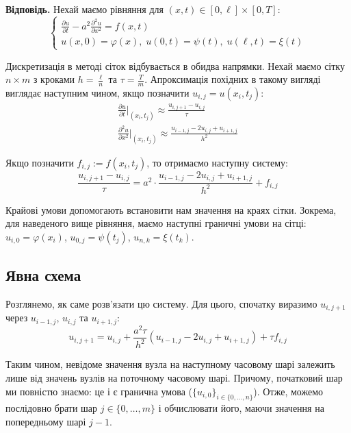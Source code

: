 \documentclass{test_template}
\begin{document}
\textbf{Відповідь.} Нехай маємо рівняння для $(x,t) \in [0,\ell] \times [0,T]$:
\begin{equation*}
    \begin{cases}
        \frac{\partial u}{\partial t} - a^2 \frac{\partial^2 u}{\partial x^2} = f(x,t) \\
        u(x,0) = \varphi(x), \; u(0,t) = \psi(t), \; u(\ell,t) = \xi(t)
    \end{cases}
\end{equation*}

Дискретизація в методі сіток відбувається в обидва напрямки. Нехай маємо сітку
$n \times m$ з кроками $h=\frac{\ell}{n}$ та $\tau = \frac{T}{m}$. Апроксимація
похідних в такому вигляді виглядає наступним чином, якщо позначити
$u_{i,j}=u(x_i,t_j)$:
\begin{gather*}
    \frac{\partial u}{\partial t}\Big|_{(x_i,t_j)} \approx \frac{u_{i,j+1} - u_{i,j}}{\tau} \\
    \frac{\partial^2 u}{\partial x^2}\Big|_{(x_i,t_j)} \approx \frac{u_{i-1,j} - 2u_{i,j} + u_{i+1,j}}{h^2}
\end{gather*}

Якщо позначити $f_{i,j} := f(x_i,t_j)$, то отримаємо наступну систему:
\begin{equation*}
    \frac{u_{i,j+1}-u_{i,j}}{\tau} = a^2 \cdot \frac{u_{i-1,j} - 2u_{i,j} + u_{i+1,j}}{h^2} + f_{i,j}
\end{equation*}

Крайові умови допомогають встановити нам значення на краях сітки. Зокрема, для
наведеного вище рівняння, маємо наступні граничні умови на сітці: $u_{i,0} =
\varphi(x_i)$, $u_{0,j} = \psi(t_j)$, $u_{n,k} = \xi(t_k)$.

\subsection{Явна схема}

Розглянемо, як саме розв'язати цю систему. Для цього, спочатку
виразимо $u_{i,j+1}$ через $u_{i-1,j}$, $u_{i,j}$ та $u_{i+1,j}$:
\begin{equation*}
    u_{i,j+1} = u_{i,j} + \frac{a^2\tau}{h^2}(u_{i-1,j}-2u_{i,j}+u_{i+1,j}) + \tau f_{i,j}
\end{equation*}

Таким чином, невідоме значення вузла на наступному часовому шарі залежить лише
від значень вузлів на поточному часовому шарі. Причому, початковий шар ми
повністю знаємо: це і є гранична умова ($\{u_{i,0}\}_{i \in \{0,\dots,n\}}$).
Отже, можемо послідовно брати шар $j \in \{0,\dots,m\}$ і обчислювати
його, маючи значення на попередньому шарі $j-1$. 
\end{document}
